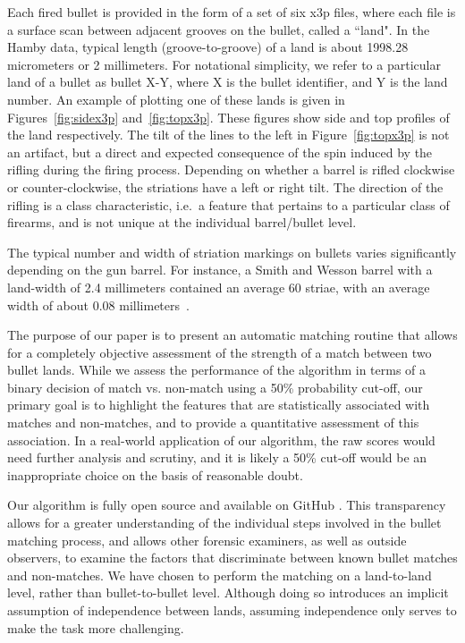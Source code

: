 \documentclass[aoas, preprint]{imsart}\usepackage[]{graphicx}\usepackage[]{color}
\begin{document}
Each fired bullet is provided in the form of a set of six x3p files, where each file is a surface scan between adjacent grooves on the bullet, called a ``land". In the Hamby data, typical length (groove-to-groove) of a land is about 1998.28 micrometers or 2 millimeters. For notational simplicity, we refer to a particular land of a bullet as bullet X-Y, where X is the bullet identifier, and Y is the land number. An example of plotting one of these lands is given in Figures~\ref{fig:sidex3p} and~\ref{fig:topx3p}. These figures show side and top profiles of the land respectively. The tilt of the lines to the left in Figure~\ref{fig:topx3p} is not an artifact, but a direct and expected consequence of the spin induced by the rifling during the firing process. Depending on whether a barrel is rifled clockwise or counter-clockwise, the striations have a left or right tilt. The direction of the rifling is a class characteristic, i.e.\ a feature that pertains to a particular class of firearms, and is not unique at the individual barrel/bullet level.

The typical number and width of striation markings on bullets varies significantly depending on the gun barrel. For instance, a Smith and Wesson barrel with a land-width of 2.4 millimeters contained an average 60 striae, with an average width of about 0.08 millimeters~\citep{chu:2011}.

The purpose of our paper is to present an automatic matching routine that allows for a completely objective assessment of the strength of a match between two bullet lands. While we assess the performance of the algorithm in terms of a binary decision of match vs. non-match using a 50\% probability cut-off, our primary goal is to highlight the features that are statistically associated with matches and non-matches, and to provide a quantitative assessment of this association. In a real-world application of our algorithm, the raw scores would need further analysis and scrutiny, and it is likely a 50\% cut-off would be an inappropriate choice on the basis of reasonable doubt.

Our algorithm is fully open source and available on GitHub \citep{bulletr}. This transparency allows for a greater understanding of the individual steps involved in the bullet matching process, and allows other forensic examiners, as well as outside observers, to examine the factors that discriminate between known bullet matches and non-matches. We have chosen to perform the matching on a land-to-land level, rather than bullet-to-bullet level. Although doing so introduces an implicit assumption of independence between lands, assuming independence only serves to make the task more challenging.
\end{document}
